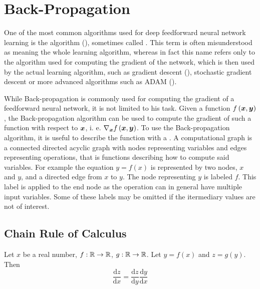 \chapter{Back-Propagation}\label{backprop}

One of the most common algorithms used for deep feedforward neural network learning is the  algorithm (\cite{rumelhart_learning_1986}), sometimes called . This term is often misunderstood as meaning the whole learning algorithm, whereas in fact this name refers only to the algorithm used for computing the gradient of the network, which is then used by the actual learning algorithm, such as gradient descent (\cite{cauchy_methode_1847}), stochastic gradient descent or more advanced algorithms such as ADAM (\cite{kingma_adam:_2014}).

While Back-propagation is commonly used for computing the gradient of a feedforward neural network, it is not limited to his task. Given a function \( f \left( \bm{x}, \bm{y} \right) \), the Back-propagation algorithm can be used to compute the gradient of such a function with respect to \( \bm{x} \), i. e. \( \nabla_{\bm{x}} f \left( \bm{x}, \bm{y} \right) \). To use the Back-propagation algorithm, it is useful to describe the function with a . A computational graph is a connected directed acyclic graph with nodes representing variables and edges representing operations, that is functions describing how to compute said variables. For example the equation \( y = f \left( x \right) \) is represented by two nodes, \( x \) and \( y \), and a directed edge from \( x \) to \( y \). The node representing \( y \) is labeled \( f \). This label is applied to the end node as the operation can in general have multiple input variables. Some of these labels may be omitted if the itermediary values are not of interest.

\section{Chain Rule of Calculus}
\begin{theorem}\label{chain_rule}
	Let \( x \) be a real number, \( f : \mathbb{R} \to \mathbb{R} \), \( g : \mathbb{R} \to \mathbb{R} \). Let \( y = f \left( x \right) \) and \( z = g \left( y \right) \). Then
	\[ \frac{\mathrm{d} z}{\mathrm{d} x} = \frac{\mathrm{d} z}{\mathrm{d} y} \frac{\mathrm{d} y}{\mathrm{d} x} \]
\end{theorem}

